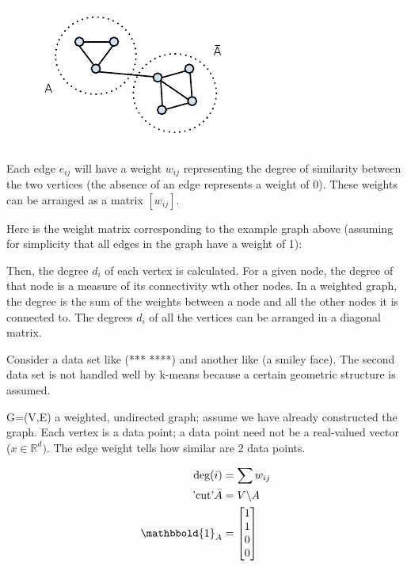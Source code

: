 \documentclass[11pt]{article}
\begin{document}
\begin{figure}
\includegraphics{graph_cut}
\caption{}
\end{figure}

Each edge $e_{ij}$ will have a weight $w_{ij}$ representing the degree of similarity between the two vertices (the absence of an edge represents a weight of 0).  These weights can be arranged as a matrix $[w_{ij}]$.

Here is the weight matrix corresponding to the example graph above (assuming for simplicity that all edges in the graph have a weight of 1):

Then, the degree $d_i$ of each vertex is calculated.  For a given node, the degree of that node is a measure of its connectivity wth other nodes.  In a weighted graph, the degree is the sum of the weights between a node and all the other nodes it is connected to.  The degrees $d_i$ of all the vertices can be arranged in a diagonal matrix.


Consider a data set like (***    ****) and another like (a smiley face).  The second data set is not handled well by k-means because a certain geometric structure is assumed.


G=(V,E) a weighted, undirected graph; assume we have already constructed the graph.
Each vertex is a data point; a data point need not be a real-valued vector ($x \in \mathbb{R}^d)$.
The edge weight tells how similar are 2 data points.

\begin{align}
\text{deg}(i) &=\sum w_{ij} \\
\text{'cut'} \bar{A} &=V \backslash A \\
\mathbbold{1}_A &= \begin{bmatrix}
 1 \\
 1 \\
 0 \\
 0
\end{bmatrix}
\end{align}
\end{document}

